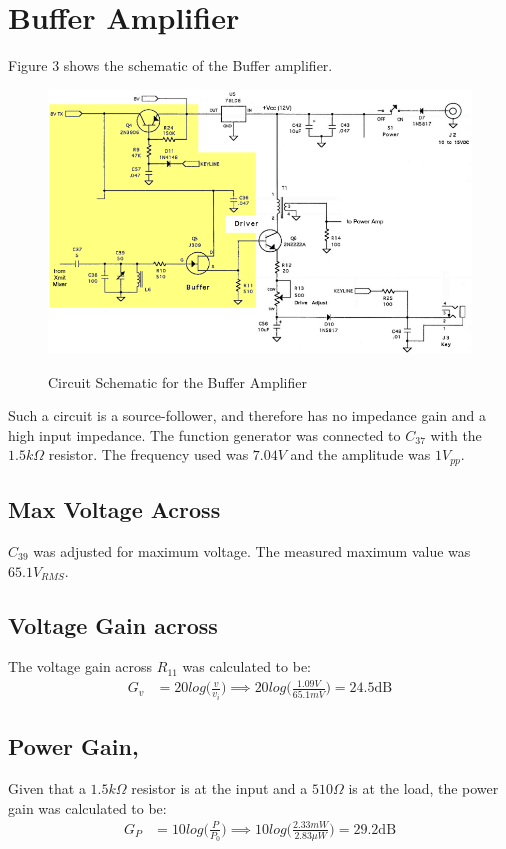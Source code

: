 \section{Buffer Amplifier}

Figure 3 shows the schematic of the Buffer amplifier.

\begin{figure}[h!]
  \centering
  \includegraphics[scale=0.5]{./img/BuffAmp.png}
  \label{BuffAmp}
  \caption{Circuit Schematic for the Buffer Amplifier}
\end{figure}

Such a circuit is a source-follower, and therefore has no impedance gain and a
high input impedance. The function generator was connected to $C_{37}$ with
the $1.5k\Omega$ resistor. The frequency used was $7.04V$ and the amplitude was $1V_{pp}$.

\subsection{Max Voltage Across }
$C_{39}$ was adjusted for maximum voltage. The measured maximum value
was $\boxed{65.1 V_{RMS}}$.

\subsection{Voltage Gain  across }
The voltage gain across $R_{11}$ was calculated to be:
\begin{align*}
  G_v &= 20log\bigg( \frac{v}{v_i} \bigg)
      \implies 20log\bigg( \frac{1.09V}{65.1mV} \bigg)
      = \boxed{24.5 \text{dB}}
\end{align*}


\subsection{Power Gain, }
Given that a $1.5k\Omega$ resistor is at the input and a $510\Omega$ is
at the load, the power gain was calculated to be:
\begin{align*}
  G_P &= 10log\bigg( \frac{P}{P_0} \bigg)
      \implies 10log\bigg( \frac{2.33mW}{2.83\mu W} \bigg)
      = \boxed{29.2 \text{dB}}
\end{align*}


